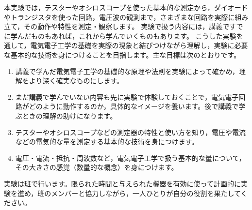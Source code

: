 

本実験では，テスターやオシロスコープを使った基本的な測定から，ダイオードやトランジスタを使った回路，電圧波の観測まで，さまざまな回路を実際に組み立て，その動作や特性を測定・観察します。
実験で扱う内容には，講義ですでに学んだものもあれば，これから学んでいくものもあります。
こうした実験を通して，電気電子工学の基礎を実際の現象と結びつけながら理解し，実験に必要な基本的な技術を身につけることを目指します。主な目標は次のとおりです。

\begin{enumerate}[label=\textbf{\arabic*.}, leftmargin=*, labelsep=0.8em, itemsep=0.4\baselineskip]
  \item 講義で学んだ電気電子工学の基礎的な原理や法則を実験によって確かめ，理解をより深く確実なものにします。
  \item まだ講義で学んでいない内容も先に実験で体験しておくことで，電気電子回路がどのように動作するのか，具体的なイメージを養います。後で講義で学ぶときの理解の助けになります。
  \item テスターやオシロスコープなどの測定器の特性と使い方を知り，電圧や電流などの電気的な量を測定する基本的な技術を身につけます。
  \item 電圧・電流・抵抗・周波数など，電気電子工学で扱う基本的な量について，その大きさの感覚（数量的な概念）を身につけます。
\end{enumerate}

実験は班で行います。限られた時間と与えられた機器を有効に使って計画的に実験を進め，班のメンバーと協力しながら，一人ひとりが自分の役割を果たしてください。
